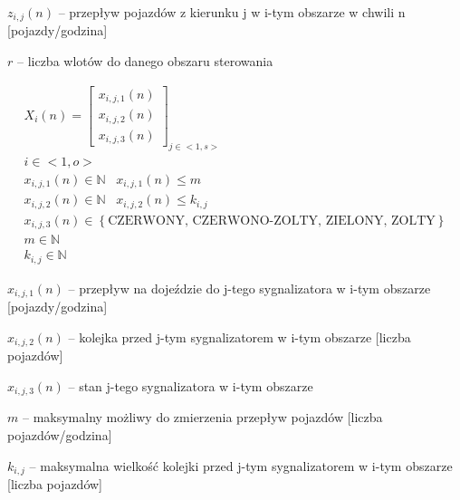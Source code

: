 \begin{math} z_{i,j} (n) \end{math} \textrm{ -- przepływ pojazdów z kierunku j w i-tym obszarze w chwili n [pojazdy/godzina]}

\begin{math} r \end{math} -- liczba wlotów do danego obszaru sterowania

\begin{equation}
	\begin{array}{c}
		X_i (n) = \left[
			\begin{array}{c}
				x_{i, j, 1} (n) \\ x_{i, j, 2} (n) \\ x_{i, j, 3} (n)
			\end{array}
		\right]_{j \in <1,s>}\\
		i \in <1,o>\\
		x_{i, j, 1} (n) \in \mathbb{N} \;\;\; x_{i, j, 1} (n) \leq m\\
		x_{i, j, 2} (n) \in \mathbb{N} \;\;\; x_{i, j, 2} (n) \leq k_{i, j}\\
		x_{i, j, 3} (n) \in \left\{ \textrm{CZERWONY, CZERWONO-ZOLTY, ZIELONY, ZOLTY} \right\}\\
		m \in \mathbb{N}\\
		k_{i, j} \in \mathbb{N}
	\end{array}
\end{equation}

\begin{math} x_{i, j, 1} (n) \end{math} \textrm{ -- przepływ na dojeździe do j-tego sygnalizatora w i-tym obszarze [pojazdy/godzina]}

\begin{math} x_{i, j, 2} (n) \end{math} \textrm{ -- kolejka przed j-tym sygnalizatorem w i-tym obszarze [liczba pojazdów]}

\begin{math} x_{i, j, 3} (n) \end{math} \textrm{ -- stan j-tego sygnalizatora w i-tym obszarze}

\begin{math} m \end{math} \textrm{ -- maksymalny możliwy do zmierzenia przepływ pojazdów [liczba pojazdów/godzina]}

\begin{math} k_{i, j} \end{math} \textrm{ -- maksymalna wielkość kolejki przed j-tym sygnalizatorem w i-tym obszarze [liczba pojazdów]}

